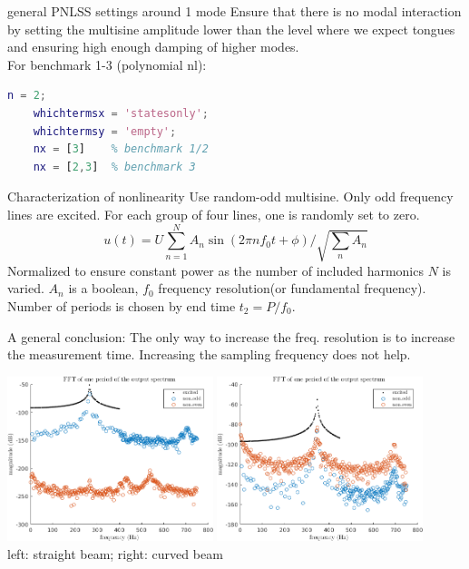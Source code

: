 \documentclass[9pt]{beamer}
\begin{document}
\begin{frame}[fragile]{general PNLSS settings around 1 mode}
  Ensure that there is no modal interaction by setting the multisine amplitude
  lower than the level where we expect tongues and ensuring high
  enough damping of higher modes.\\
  For benchmark 1-3 (polynomial nl):

  \begin{lstlisting}[language=matlab]
    n = 2;
    whichtermsx = 'statesonly';
    whichtermsy = 'empty';
    nx = [3]    % benchmark 1/2
    nx = [2,3]  % benchmark 3
  \end{lstlisting}
\end{frame}




\begin{frame}{Characterization of nonlinearity}
  Use random-odd multisine. Only odd frequency lines are excited. For each group
  of four lines, one is randomly set to zero.
  \begin{equation}
    \label{eq:multisine}
    u(t) = U \sum_{n=1}^N A_n \sin(2\pi nf_0t + \phi) / \textstyle \sqrt{\sum_n A_n}
  \end{equation}
  Normalized to ensure constant power as the number of included harmonics $N$ is
  varied. $A_n$ is a boolean, $f_0$ frequency resolution(or fundamental
  frequency). Number of periods is chosen by end time $t_2=P/f_0$.

  A general conclusion: The only way to increase the freq. resolution is to
  increase the measurement time. Increasing the sampling frequency does not
  help.

    \begin{center}
      \includegraphics[width=0.45\textwidth]{fig/ms_nl_detection_b2}
      \includegraphics[width=0.45\textwidth]{fig/ms_nl_detection_b3}\\
      left: straight beam; right: curved beam
    \end{center}
\end{frame}
\end{document}
